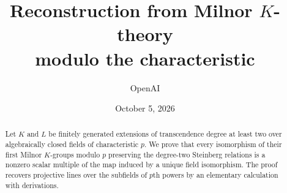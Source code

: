 \documentclass[11pt]{article}
\title{Reconstruction from Milnor $K$-theory\\modulo the characteristic}
\author{OpenAI}
\date{October 5, 2026}
\begin{document}
\maketitle
\begin{abstract}
Let $K$ and $L$ be finitely generated extensions of transcendence degree
at least two over algebraically closed fields of characteristic $p$.
We prove that every isomorphism of their first Milnor $K$-groups modulo
$p$ preserving the degree-two Steinberg relations is a nonzero scalar
multiple of the map induced by a unique field isomorphism. The proof
recovers projective lines over the subfields of $p$th powers by an
elementary calculation with derivations.
\end{abstract}






{\raggedright

}
\end{document}
